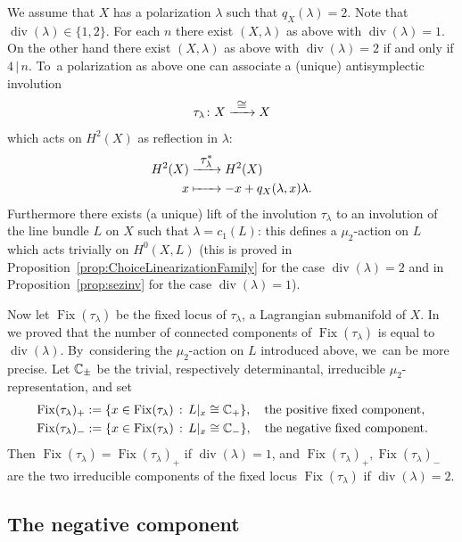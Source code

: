 \documentclass[11pt]{article}
\newcommand\To[1]{\mathchoice{\xrightarrow{\textstyle\kern4pt#1\kern3pt}}{\stackrel{#1}{\longrightarrow}}{}{}}
\newcommand\Mto[1]{\mathrel{\mapstochar\To{#1}}}
\DeclareMathOperator{\divisore}{div}\let\div\divisore
\DeclareMathOperator{\Fix}{Fix}
\theoremstyle{definition}
\begin{document}
We assume that $X$ has a polarization $\lambda$ such that $q_X(\lambda)=2$. Note that $\divisore(\lambda)\in\{1,2\}$. For each $n$ there exist $(X,\lambda)$ as above with
$\divisore(\lambda)=1$. On the other hand there exist $(X,\lambda)$ as above with
$\divisore(\lambda)=2$ if and only if
$4\,|\,n$. To~a polarization as above one can associate a (unique) antisymplectic involution
\[
\tau_{\lambda}\colon X\To{\cong}X
\]
which acts on $H^2(X)$ as reflection in $\lambda$:
\begin{equation}\label{riflessione}
\begin{aligned}
H^2(X) & \To{\tau^{*}_{\lambda}}  H^2(X) \\
x & \Mto{\hphantom{\tau^{*}_{\lambda}}}  -x+q_X(\lambda,x)\lambda.
\end{aligned}
\end{equation}
Furthermore there exists (a unique) lift of the involution $\tau_{\lambda}$ to an involution of the line bundle $L$ on $X$ such that $\lambda=c_1(L)$: this
defines a $\mu_2$-action on $L$ which acts trivially on $H^0(X,L)$ (this is proved in Proposition~\ref{prop:ChoiceLinearizationFamily} for the case $\divisore(\lambda)=2$ and in Proposition~\ref{prop:sezinv} for the case $\divisore(\lambda)=1$).

Now let $\Fix(\tau_{\lambda})$ be the fixed locus of $\tau_{\lambda}$, a Lagrangian submanifold of $X$.
In~\cite{involutions1} we proved that the number of connected components of $\Fix(\tau_{\lambda})$ is equal to $\divisore(\lambda)$. By~considering the $\mu_2$-action on $L$ introduced above, we~can be more precise.
Let ${\mathbb C}_{\pm}$ be the trivial, respectively determinantal, irreducible $\mu_2$-representation, and set
\begin{equation*}\label{eq:SigmaPM}
\begin{split}
&\Fix(\tau_{\lambda})_+ :=\{ x\in \Fix(\tau_\lambda) \,:\, L\vert_x \cong \C_+\},\quad \text{the \emph{positive} fixed component},\\
&\Fix(\tau_{\lambda})_- :=\{ x\in \Fix(\tau_\lambda) \,:\, L\vert_x \cong \C_-\},\quad \text{the \emph{negative} fixed component}.
\end{split}
\end{equation*}
Then $\Fix(\tau_{\lambda})=\Fix(\tau_{\lambda})_+$ if $\divisore(\lambda)=1$, and $\Fix(\tau_{\lambda})_+,\Fix(\tau_{\lambda})_-$ are the two irreducible components of the fixed locus $\Fix(\tau_{\lambda})$ if $\divisore(\lambda)=2$.

\subsection{The negative component}\label{subsec:Fano}
\end{document}

